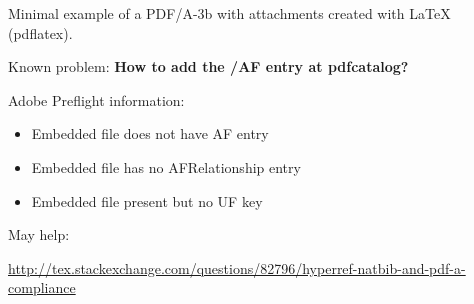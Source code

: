 \documentclass{article}
\begin{document}
Minimal example of a PDF/A-3b with attachments created with LaTeX (pdflatex).

Known problem: \textbf{How to add the /AF entry at pdfcatalog?}

Adobe Preflight information:
\begin{itemize}
  \item Embedded file does not have AF entry
  \item Embedded file has no AFRelationship entry 
  \item Embedded file present but no UF key
\end{itemize}


May help:

\url{http://tex.stackexchange.com/questions/82796/hyperref-natbib-and-pdf-a-compliance}
\end{document}
